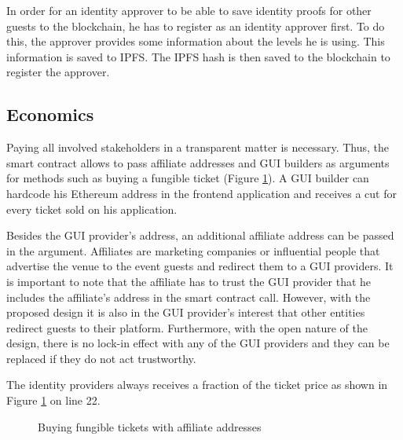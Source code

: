 In order for an identity approver to be able to save identity proofs for other guests to the blockchain, he has to register as an identity approver first. To do this, the approver provides some information about the levels he is using. This information is saved to IPFS. The IPFS hash is then saved to the blockchain to register the approver.

\subsection{Economics}\label{sc:econom}
Paying all involved stakeholders in a transparent matter is necessary. Thus, the smart contract allows to pass affiliate addresses and GUI builders as arguments for methods such as buying a fungible ticket (Figure \ref{code:buy-ticket-function}). A GUI builder can hardcode his Ethereum address in the frontend application and receives a cut for every ticket sold on his application. 

Besides the GUI provider's address, an additional affiliate address can be passed in the argument. Affiliates are marketing companies or influential people that advertise the venue to the event guests and redirect them to a GUI providers. It is important to note that the affiliate has to trust the GUI provider that he includes the affiliate's address in the smart contract call. However, with the proposed design it is also in the GUI provider's interest that other entities redirect guests to their platform. Furthermore, with the open nature of the design, there is no lock-in effect with any of the GUI providers and they can be replaced if they do not act trustworthy.

The identity providers always receives a fraction of the ticket price as shown in Figure \ref{code:buy-ticket-function} on line 22.

\begin{figure}[H]
    
    \caption{Buying fungible tickets with affiliate addresses}
    \label{code:buy-ticket-function}
\end{figure}



